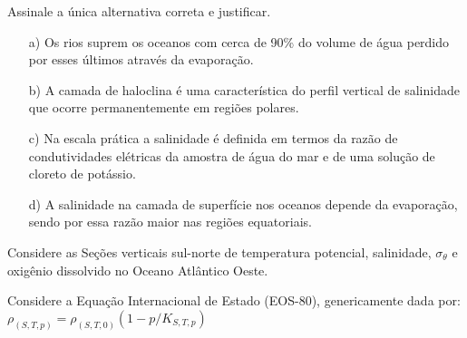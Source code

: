 \begin{questions}
  Assinale a única alternativa correta e justificar.
  \begin{itemize}
    \item[a)] Os rios suprem os oceanos com cerca de 90\% do volume de água
              perdido por esses últimos através da evaporação.
    \item[b)] A camada de haloclina é uma característica do perfil vertical de
              salinidade que ocorre permanentemente em regiões polares.
    \item[c)] Na escala prática a salinidade é definida em termos da razão de
              condutividades elétricas da amostra de água do mar e de uma
              solução de cloreto de potássio.
    \item[d)] A salinidade na camada de superfície nos oceanos depende da
              evaporação, sendo por essa razão maior nas regiões equatoriais.
  \end{itemize}
\end{questions}

\begin{questions}
  Considere as Seções verticais sul-norte de temperatura potencial, salinidade,
  $\sigma_{\theta}$ e oxigênio dissolvido no Oceano Atlântico Oeste.

\end{questions}

\begin{questions}
  Considere a Equação Internacional de Estado (EOS-80), genericamente dada por:
  $\rho_{(S, T, p)} = \rho_{(S, T, 0)}(1 - p / K_{S,T, p})$

\end{questions}

